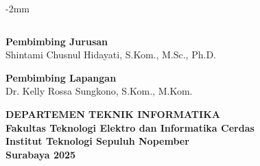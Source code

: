 \begin{flushleft}
\begin{adjustwidth}{-2mm}{}
\begin{tabular}{lcp{0.7\linewidth}}
    \end{tabular}
  \end{adjustwidth}
  \vspace{2ex}
  \noindent\textbf{Pembimbing Jurusan} \\
  \normalsize{Shintami Chusnul Hidayati, S.Kom., M.Sc., Ph.D.}
  \vspace{2ex}
  
  \noindent\textbf{Pembimbing Lapangan} \\
  \normalsize{Dr. Kelly Rossa Sungkono, S.Kom., M.Kom.}
  \vspace{3ex}
  
  \noindent\textbf{DEPARTEMEN TEKNIK INFORMATIKA} \\
  \textbf{Fakultas Teknologi Elektro dan Informatika Cerdas} \\
  \textbf{Institut Teknologi Sepuluh Nopember} \\
  \textbf{Surabaya 2025}

\end{flushleft}

\restoregeometry
